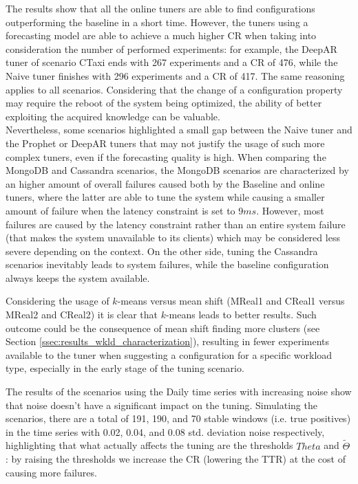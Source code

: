 \documentclass[a4paper, 12pt]{article} %
\begin{document}
	The results show that all the online tuners are able to find configurations outperforming the baseline in a short time. However, the tuners using a forecasting model are able to achieve a much higher CR when taking into consideration the number of performed experiments: for example, the DeepAR tuner of scenario CTaxi ends with 267 experiments and a CR of 476, while the Naive tuner finishes with 296 experiments and a CR of 417. The same reasoning applies to all scenarios. Considering that the change of a configuration property may require the reboot of the system being optimized, the ability of better exploiting the acquired knowledge can be valuable. \\
	Nevertheless, some scenarios highlighted a small gap between the Naive tuner and the Prophet or DeepAR tuners that may not justify the usage of such more complex tuners, even if the forecasting quality is high.
	When comparing the MongoDB and Cassandra scenarios, the MongoDB scenarios are characterized by an higher amount of overall failures caused both by the Baseline and online tuners, where the latter are able to tune the system while causing a smaller amount of failure when the latency constraint is set to $9ms$. However, most failures are caused by the latency constraint rather than an entire system failure (that makes the system unavailable to its clients) which may be considered less severe depending on the context. On the other side, tuning the Cassandra scenarios inevitably leads to system failures, while the baseline configuration always keeps the system available. 
	
	Considering the usage of $k$-means versus mean shift (MReal1 and CReal1 versus MReal2 and CReal2) it is clear that $k$-means leads to better results. Such outcome could be the consequence of mean shift finding more clusters (see Section \ref{ssec:results_wkld_characterization}), resulting in fewer experiments available to the tuner when suggesting a configuration for a specific workload type, especially in the early stage of the tuning scenario. 

	The results of the scenarios using the Daily time series with increasing noise show that noise doesn't have a significant impact on the tuning. Simulating the scenarios, there are a total of 191, 190, and 70 stable windows (i.e. true positives) in the time series with 0.02, 0.04, and 0.08 std. deviation noise respectively, highlighting that  what actually affects the tuning are the thresholds $Theta$ and $\tilde{\Theta}$: by raising the thresholds we increase the CR (lowering the TTR) at the cost of causing more failures. 
	
\end{document}
